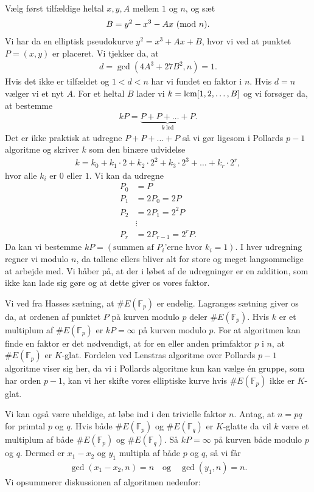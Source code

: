 Vælg først tilfældige heltal $x, y, A$ mellem $1$ og $n$, og sæt
\begin{align*}
	B = y^2 - x^3 - Ax \ (\mathrm{mod} \ n).
\end{align*} 
Vi har da en elliptisk pseudokurve $y^2 = x^3 + Ax + B$, 
hvor vi ved at punktet $P=(x, y)$ er placeret. Vi tjekker da, at
\begin{align*}
	d= \gcd(4A^3 + 27B^2, n) = 1.
\end{align*}
Hvis det ikke er tilfældet og $1 < d < n$ har vi fundet en faktor i $n$. Hvis $d = n$ vælger vi et nyt $A$. For et heltal $B$ lader vi $k=\mathrm{lcm}[1, 2, \ldots, B]$ og vi forsøger da, at bestemme
\begin{align*}
	kP = \underbrace{P + P + \ldots + P}_{k \ \text{led}}.
\end{align*}
Det er ikke praktisk at udregne $P+P+ \ldots + P$ så vi gør ligesom i Pollards $p-1$ algoritme og skriver $k$ som den binære udvidelse
\begin{align*}
	k = k_0 + k_1 \cdot 2 + k_2 \cdot 2^2 + k_ 3 \cdot 2^3 + \ldots + k_r \cdot 2^r,
\end{align*}
hvor alle $k_i$ er $0$ eller $1$. Vi kan da udregne
\begin{align*}
	P_0 &= P \\
	P_1 &= 2P_0 = 2P \\
	P_2 &= 2P_1 = 2^2 P \\
	&\vdots \\
	P_r &= 2 P_{r-1} = 2^r P.
\end{align*}
Da kan vi bestemme $kP= (\text{summen af $P_i$'erne hvor $k_i = 1$})$. I hver udregning regner vi modulo $n$, da tallene ellers bliver alt for store og meget langsommelige at arbejde med. Vi håber på, at der i løbet af de udregninger er en addition, som ikke kan lade sig gøre og at dette giver os vores faktor. 

Vi ved fra Hasses sætning, at $\#E(\mathbb{F}_p)$ er endelig. Lagranges sætning giver os da, at ordenen af punktet $P$ på kurven modulo $p$ deler $\#E(\mathbb{F}_p)$. Hvis $k$ er et multiplum af $\#E(\mathbb{F}_p)$ er $kP = \infty$ på kurven modulo $p$. For at algoritmen kan finde en faktor er det nødvendigt, at for en eller anden primfaktor $p$ i $n$, at $\#E(\mathbb{F}_p)$ er $K$-glat. Fordelen ved Lenstras algoritme over Pollards $p-1$ algoritme viser sig her, da vi i Pollards algoritme kun kan vælge én gruppe, som har orden $p-1$, kan vi her skifte vores elliptiske kurve hvis $\#E(\mathbb{F}_p)$ ikke er $K$-glat.

Vi kan også være uheldige, at løbe ind i den trivielle faktor $n$. Antag, at $n = pq$ for primtal $p$ og $q$. Hvis både $\#E(\mathbb{F}_p)$ og $\#E(\mathbb{F}_q)$ er $K$-glatte da vil $k$ være et multiplum af både $\#E(\mathbb{F}_p)$ og $\#E(\mathbb{F}_q)$. Så $kP = \infty$ på kurven både modulo $p$ og $q$. Dermed er $x_1 - x_2$ og $y_1$ multipla af både $p$ og $q$, så vi får
\begin{align*}
	\gcd(x_1 - x_2, n) = n \quad \text{og} \quad \gcd(y_1, n) = n.
\end{align*}
Vi opsummerer diskussionen af algoritmen nedenfor:

